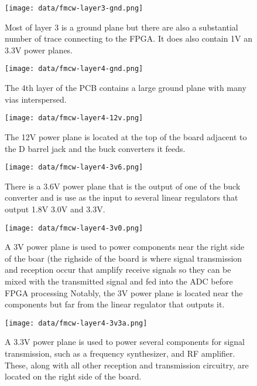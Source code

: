 \documentclass{default}
\begin{document}
\begin{figure}[h]
  \centering
  \texttt{[image: data/fmcw-layer3-gnd.png]}
  \caption{Most of layer 3 is a ground plane but there are also a substantial number of trace
    connecting to the FPGA. It does also contain 1V an 3.3V power planes.}
  \label{fig:fmcw-layer3-gnd}
\end{figure}

\begin{figure}[h]
  \centering
  \texttt{[image: data/fmcw-layer4-gnd.png]}
  \caption{The 4th layer of the PCB contains a large ground plane with many vias interspersed.}
  \label{fig:fmcw-layer4-gnd}
\end{figure}

\begin{figure}[h]
  \centering
  \texttt{[image: data/fmcw-layer4-12v.png]}
  \caption{The 12V power plane is located at the top of the board adjacent to the D barrel jack and
    the buck converters it feeds.}
  \label{fig:fmcw-layer4-12v}
\end{figure}

\begin{figure}[h]
  \centering
  \texttt{[image: data/fmcw-layer4-3v6.png]}
  \caption{There is a 3.6V power plane that is the output of one of the buck converter and is use as
    the input to several linear regulators that output 1.8V 3.0V and 3.3V.}
  \label{fig:fmcw-layer4-3v6}
\end{figure}

\begin{figure}[h]
  \centering\texttt{[image: data/fmcw-layer4-3v0.png]}
  \caption{A 3V power plane is used to power components near the right side of the boar (the
    righside of the board is where signal transmission and reception occur that amplify receive
    signals so they can be mixed with the transmitted signal and fed into the ADC before FPGA
    processing Notably, the 3V power plane is located near the components but far from the linear
    regulator that outputs it.}
  \label{fig:fmcw-layer4-3v0}
\end{figure}

\begin{figure}[h]
  \centering\texttt{[image: data/fmcw-layer4-3v3a.png]}
  \caption{A 3.3V power plane is used to power several components for signal transmission, such as
    a frequency synthesizer, and RF amplifier. These, along with all other reception and
    transmission circuitry, are located on the right side of the board.}
  \label{fig:fmcw-layer4-3v3a}
\end{figure}
\end{document}
